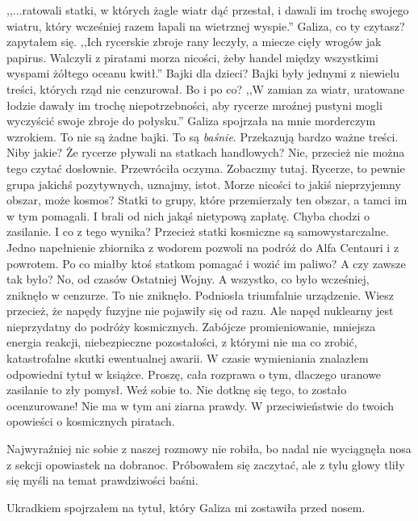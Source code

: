 \begin{dialogue}
	\ds{} ,,...ratowali statki, w których żagle wiatr dąć przestał, i dawali im trochę swojego wiatru, który wcześniej razem łapali na wietrznej wyspie.''
	\ds{} Galiza, co ty czytasz? \dm{} zapytałem się.
	\ds{} ,,Ich rycerskie zbroje rany leczyły, a miecze cięły wrogów jak papirus. Walczyli z piratami morza nicości, żeby handel między wszystkimi wyspami żółtego oceanu kwitł.''
	\ds{} Bajki dla dzieci? \dm{} Bajki były jednymi z niewielu treści, których rząd nie cenzurował. Bo i po co?
	\ds{} ,,W zamian za wiatr, uratowane łodzie dawały im trochę niepotrzebności, aby rycerze mroźnej pustyni mogli wyczyścić swoje zbroje do połysku.'' \dm{} Galiza spojrzała na mnie morderczym wzrokiem. \dm{} To nie są żadne bajki. To są \emph{baśnie}. Przekazują bardzo ważne treści.
	\ds{} Niby jakie? Że rycerze pływali na statkach handlowych?
	\ds{} Nie, przecież nie można tego czytać dosłownie. \dm{} Przewróciła oczyma. \dm{} Zobaczmy tutaj. Rycerze, to pewnie grupa jakichś pozytywnych, uznajmy, istot. Morze nicości to jakiś nieprzyjemny obszar, może kosmos? Statki to grupy, które przemierzały ten obszar, a tamci im w tym pomagali. I brali od nich jakąś nietypową zapłatę. Chyba chodzi o zasilanie.
	\ds{} I co z tego wynika? Przecież statki kosmiczne są samowystarczalne. Jedno napełnienie zbiornika z wodorem pozwoli na podróż do Alfa Centauri i z powrotem. Po co miałby ktoś statkom pomagać i wozić im paliwo?
	\ds{} A czy zawsze tak było?
	\ds{} No, od czasów Ostatniej Wojny. A wszystko, co było wcześniej, zniknęło w cenzurze.
	\ds{} To nie zniknęło. \dm{} Podniosła triumfalnie urządzenie. \dm{} Wiesz przecież, że napędy fuzyjne nie pojawiły się od razu.
	\ds{} Ale napęd nuklearny jest nieprzydatny do podróży kosmicznych. Zabójcze promieniowanie, mniejsza energia reakcji, niebezpieczne pozostałości, z którymi nie ma co zrobić, katastrofalne skutki ewentualnej awarii. \dm{} W czasie wymieniania znalazłem odpowiedni tytuł w książce. \dm{} Proszę, cała rozprawa o tym, dlaczego uranowe zasilanie to zły pomysł. Weź sobie to.
	\ds{} Nie dotknę się tego, to zostało ocenzurowane! Nie ma w tym ani ziarna prawdy.
	\ds{} W przeciwieństwie do twoich opowieści o kosmicznych piratach.
\end{dialogue}

Najwyraźniej nic sobie z naszej rozmowy nie robiła, bo nadal nie wyciągnęła nosa z sekcji opowiastek na dobranoc.
Próbowałem się zaczytać, ale z tylu głowy tliły się myśli na temat prawdziwości baśni.

Ukradkiem spojrzałem na tytuł, który Galiza mi zostawiła przed nosem.

